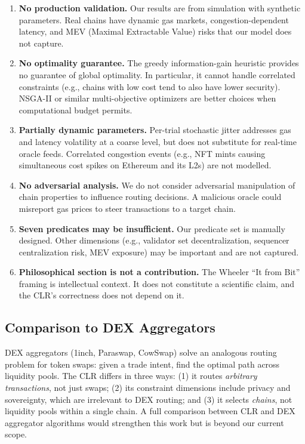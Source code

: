 \documentclass[conference, 10pt, twocolumn]{IEEEtran}
\begin{document}
\begin{enumerate}[leftmargin=*]
  \item \textbf{No production validation.}  Our results are from
    simulation with synthetic parameters.  Real chains have dynamic
    gas markets, congestion-dependent latency, and MEV (Maximal
    Extractable Value) risks that our model does not capture.

  \item \textbf{No optimality guarantee.}  The greedy information-gain
    heuristic provides no guarantee of global optimality.  In
    particular, it cannot handle correlated constraints (e.g., chains
    with low cost tend to also have lower security).  NSGA-II or
    similar multi-objective optimizers are better choices when
    computational budget permits.

  \item \textbf{Partially dynamic parameters.}  Per-trial stochastic
    jitter addresses gas and latency volatility at a coarse level, but
    does not substitute for real-time oracle feeds.  Correlated
    congestion events (e.g., NFT mints causing simultaneous cost spikes
    on Ethereum and its L2s) are not modelled.

  \item \textbf{No adversarial analysis.}  We do not consider
    adversarial manipulation of chain properties to influence routing
    decisions.  A malicious oracle could misreport gas prices to steer
    transactions to a target chain.

  \item \textbf{Seven predicates may be insufficient.}  Our predicate
    set is manually designed.  Other dimensions (e.g., validator set
    decentralization, sequencer centralization risk, MEV exposure) may
    be important and are not captured.

  \item \textbf{Philosophical section is not a contribution.}  The
    Wheeler ``It from Bit'' framing is intellectual context.  It does
    not constitute a scientific claim, and the CLR's correctness does
    not depend on it.
\end{enumerate}

\subsection{Comparison to DEX Aggregators}

DEX aggregators (1inch, Paraswap, CowSwap) solve an analogous routing
problem for token swaps: given a trade intent, find the optimal path
across liquidity pools.  The CLR differs in three ways: (1) it routes
\emph{arbitrary transactions}, not just swaps; (2) its constraint
dimensions include privacy and sovereignty, which are irrelevant to
DEX routing; and (3) it selects \emph{chains}, not liquidity pools
within a single chain.  A full comparison between CLR and DEX
aggregator algorithms would strengthen this work but is beyond our
current scope.
\end{document}
